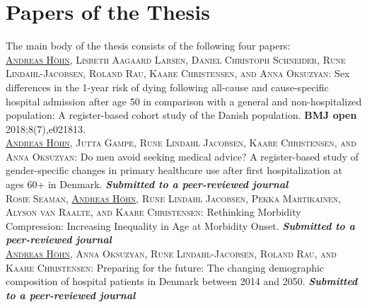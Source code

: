 
\chapter{Papers of the Thesis}
\label{ch:thesis-papers}

The main body of the thesis consists of the following four papers:\\

		\textsc{\underline{Andreas H\"ohn}, Lisbeth Aagaard Larsen, Daniel Christoph Schneider, 
		Rune Lindahl-Jacobsen, Roland Rau, Kaare Christensen, and Anna Oksuzyan:} 
		Sex differences in the 1-year risk of dying following all-cause and cause-specific hospital 
		admission after age 50 in comparison with a general and non-hospitalized population: A 
		register-based cohort study of the Danish population.
		\textbf{BMJ open} 2018;8(7),e021813.
		\textit{} 		\\
				
		\textsc{\underline{Andreas H\"ohn}, Jutta Gampe, Rune Lindahl Jacobsen, 
	    Kaare Christensen, and Anna Oksuzyan:} 
		Do men avoid seeking medical advice? A register-based study of gender-specific 
		changes in primary healthcare use after first hospitalization at ages 60+ in Denmark.
		\textbf{\textit{Submitted to a peer-reviewed journal}} \\	
  
		\textsc{Rosie Seaman, \underline{Andreas H\"ohn}, Rune Lindahl Jacobsen, 
		Pekka Martikainen, Alyson van Raalte, and Kaare Christensen:} Rethinking Morbidity Compression: 
		Increasing Inequality in Age at Morbidity Onset.
		\textbf{\textit{Submitted to a peer-reviewed journal}} 	\\

		\textsc{\underline{Andreas H\"ohn}, Anna Oksuzyan, Rune Lindahl-Jacobsen, 
	    Roland Rau, and Kaare Christensen:} Preparing for the future: The changing demographic 
	    composition of hospital patients in Denmark between 2014 and 2050.
		\textbf{\textit{Submitted to a peer-reviewed journal}} 	


